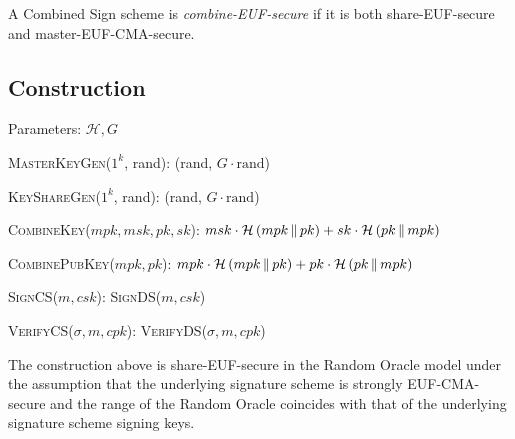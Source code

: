     \begin{definition}
      A Combined Sign scheme is \emph{\textsf{combine-EUF}-secure} if it is both
      \textsf{share-EUF}-secure and \textsf{master-EUF-CMA}-secure.
    \end{definition}

  \subsection{Construction}
    Parameters: $\mathcal{H}, G$
    \begin{algorithmic}[0]
      \State \textsc{MasterKeyGen}($1^k$, rand):
      \Indent
        \State \Return (rand, $G \cdot \mathrm{rand}$)
      \EndIndent
    \end{algorithmic}

    \begin{algorithmic}[0]
      \State \textsc{KeyShareGen}($1^k$, rand):
      \Indent
        \State \Return (rand, $G \cdot \mathrm{rand}$)
      \EndIndent
    \end{algorithmic}

    \begin{algorithmic}[0]
      \State \textsc{CombineKey}($mpk, msk, pk, sk$):
      \Indent
        \State \Return $msk \cdot \mathcal{H}\left(mpk \,\|\, pk\right) + sk
        \cdot \mathcal{H}\left(pk \,\|\, mpk\right)$
      \EndIndent
    \end{algorithmic}

    \begin{algorithmic}[0]
      \State \textsc{CombinePubKey}($mpk, pk$):
      \Indent
        \State \Return $mpk \cdot \mathcal{H}\left(mpk \,\|\, pk\right) + pk
        \cdot \mathcal{H}\left(pk \,\|\, mpk\right)$
      \EndIndent
    \end{algorithmic}

    \begin{algorithmic}[0]
      \State \textsc{SignCS}($m, csk$):
      \Indent
        \State \Return \textsc{SignDS}($m, csk$)
      \EndIndent
    \end{algorithmic}

    \begin{algorithmic}[0]
      \State \textsc{VerifyCS}($\sigma, m, cpk$):
      \Indent
        \State \Return \textsc{VerifyDS}($\sigma, m, cpk$)
      \EndIndent
    \end{algorithmic}

    \begin{lemma}
      \label{lemma:comb:share}
      The construction above is \textsf{share-EUF}-secure in the Random Oracle
      model under the assumption that the underlying signature scheme is
      strongly \textsf{EUF-CMA}-secure and the range of the Random Oracle
      coincides with that of the underlying signature scheme signing keys.
    \end{lemma}

